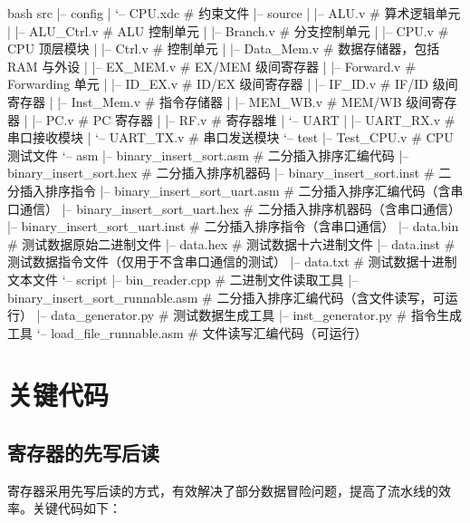 \documentclass[a4paper]{article}  %
\begin{document}
\begin{codeblock}{bash}
    src
    |-- config
    |   `-- CPU.xdc  # 约束文件
    |-- source
    |   |-- ALU.v       # 算术逻辑单元
    |   |-- ALU_Ctrl.v  # ALU 控制单元
    |   |-- Branch.v    # 分支控制单元
    |   |-- CPU.v       # CPU 顶层模块
    |   |-- Ctrl.v      # 控制单元
    |   |-- Data_Mem.v  # 数据存储器，包括 RAM 与外设
    |   |-- EX_MEM.v    # EX/MEM 级间寄存器
    |   |-- Forward.v   # Forwarding 单元
    |   |-- ID_EX.v     # ID/EX 级间寄存器
    |   |-- IF_ID.v     # IF/ID 级间寄存器
    |   |-- Inst_Mem.v  # 指令存储器
    |   |-- MEM_WB.v    # MEM/WB 级间寄存器
    |   |-- PC.v        # PC 寄存器
    |   |-- RF.v        # 寄存器堆
    |   `-- UART
    |       |-- UART_RX.v  # 串口接收模块
    |       `-- UART_TX.v  # 串口发送模块
    `-- test
        |-- Test_CPU.v  # CPU 测试文件
        `-- asm
            |-- binary_insert_sort.asm        # 二分插入排序汇编代码
            |-- binary_insert_sort.hex        # 二分插入排序机器码
            |-- binary_insert_sort.inst       # 二分插入排序指令
            |-- binary_insert_sort_uart.asm   # 二分插入排序汇编代码（含串口通信）
            |-- binary_insert_sort_uart.hex   # 二分插入排序机器码（含串口通信）
            |-- binary_insert_sort_uart.inst  # 二分插入排序指令（含串口通信）
            |-- data.bin                      # 测试数据原始二进制文件
            |-- data.hex                      # 测试数据十六进制文件
            |-- data.inst                     # 测试数据指令文件（仅用于不含串口通信的测试）
            |-- data.txt                      # 测试数据十进制文本文件
            `-- script
                |-- bin_reader.cpp                   # 二进制文件读取工具
                |-- binary_insert_sort_runnable.asm  # 二分插入排序汇编代码（含文件读写，可运行）
                |-- data_generator.py                # 测试数据生成工具
                |-- inst_generator.py                # 指令生成工具
                `-- load_file_runnable.asm           # 文件读写汇编代码（可运行）
\end{codeblock}

\section{关键代码}

\subsection{寄存器的先写后读}

寄存器采用先写后读的方式，有效解决了部分数据冒险问题，提高了流水线的效率。关键代码如下：
\end{document}
